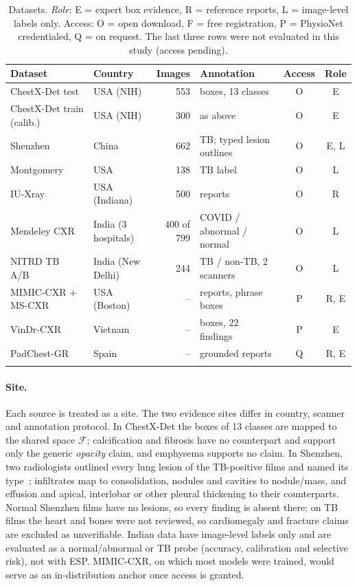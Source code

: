 \documentclass[pdflatex,sn-mathphys-num]{sn-jnl}
\theoremstyle{thmstyleone}
\begin{document}
\begin{table}[t]
\caption{Datasets. \emph{Role}: E = expert box evidence, R = reference reports, L = image-level labels only. Access: O = open download, F = free registration, P = PhysioNet credentialed, Q = on request. The last three rows were not evaluated in this study (access pending).}\label{tab:datasets}
\centering
\scriptsize
\setlength{\tabcolsep}{3pt}\begin{tabular}{@{}p{3.2cm}lrp{2.6cm}cc@{}}
\toprule
Dataset & Country & Images & Annotation & Access & Role \\
\midrule
ChestX-Det test~\cite{chestxdet} & USA (NIH) & 553 & boxes, 13 classes & O & E \\
ChestX-Det train (calib.) & USA (NIH) & 300 & as above & O & E \\
Shenzhen~\cite{shenzhen,shenzhenroi} & China & 662 & TB; typed lesion outlines & O & E, L \\
Montgomery~\cite{shenzhen} & USA & 138 & TB label & O & L \\
IU-Xray~\cite{iuxray} & USA (Indiana) & 500 & reports & O & R \\
Mendeley CXR~\cite{mendeleyin} & India (3 hospitals) & 400 of 799 & COVID / abnormal / normal & O & L \\
NITRD TB A/B~\cite{nitrd} & India (New Delhi) & 244 & TB / non-TB, 2 scanners & O & L \\
\midrule
MIMIC-CXR + MS-CXR~\cite{maira2} & USA (Boston) & -- & reports, phrase boxes & P & R, E \\
VinDr-CXR~\cite{vindr} & Vietnam & -- & boxes, 22 findings & P & E \\
PadChest-GR~\cite{padchest,padchestgr} & Spain & -- & grounded reports & Q & R, E \\
\botrule
\end{tabular}
\end{table}

\paragraph{Site.} Each source is treated as a site. The two evidence sites differ in country, scanner and annotation protocol. In ChestX-Det the boxes of 13 classes are mapped to the shared space $\mathcal{F}$; calcification and fibrosis have no counterpart and support only the generic \emph{opacity} claim, and emphysema supports no claim. In Shenzhen, two radiologists outlined every lung lesion of the TB-positive films and named its type~\cite{shenzhenroi}; infiltrates map to consolidation, nodules and cavities to nodule/mass, and effusion and apical, interlobar or other pleural thickening to their counterparts. Normal Shenzhen films have no lesions, so every finding is absent there; on TB films the heart and bones were not reviewed, so cardiomegaly and fracture claims are excluded as unverifiable. Indian data have image-level labels only and are evaluated as a normal/abnormal or TB probe (accuracy, calibration and selective risk), not with ESP. MIMIC-CXR, on which most models were trained, would serve as an in-distribution anchor once access is granted.
\end{document}
